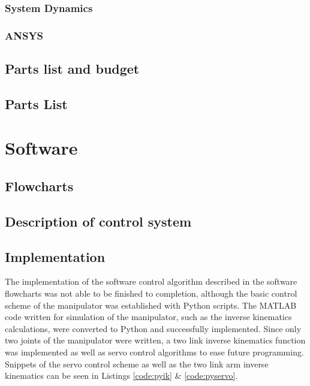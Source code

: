 \subsubsection*{System Dynamics}

\subsubsection*{ANSYS}

\newpage
\subsection*{Parts list and budget}
\subsection*{Parts List}

\section{Software}
\subsection*{Flowcharts}


\subsection*{Description of control system}
\subsection*{Implementation}
The implementation of the software control algorithm described in the software flowcharts was not able to be finished to completion, although the basic control scheme of the manipulator was established with Python scripts. The MATLAB code written for simulation of the manipulator, such as the inverse kinematics calculations, were converted to Python and successfully implemented. Since only two joints of the manipulator were written, a two link inverse kinematics function was implemented as well as servo control algorithms to ease future programming. Snippets of the servo control scheme as well as the two link arm inverse kinematics can be seen in Listings \ref{code:pyik} \& \ref{code:pyservo}.

